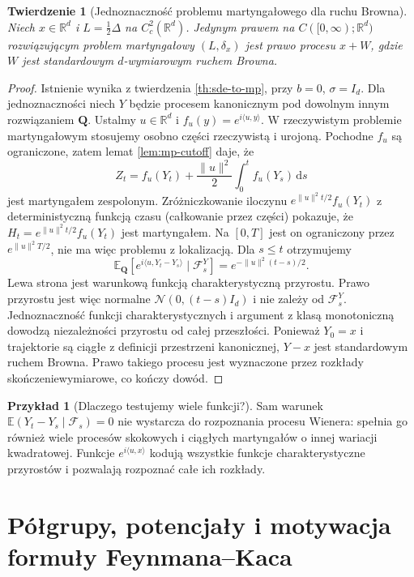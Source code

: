 \documentclass[11pt,a4paper,oneside]{report}
\numberwithin{equation}{chapter}
\theoremstyle{plain}
\newtheorem{twierdzenie}{Twierdzenie}[chapter]
\theoremstyle{definition}
\newtheorem{przyklad}{Przykład}[chapter]
\theoremstyle{remark}
\newcommand{\R}{\mathbb{R}}
\newcommand{\E}{\mathbb{E}}
\newcommand{\calF}{\mathcal{F}}
\newcommand{\dd}{\mathrm{d}}
\newcommand{\norm}[1]{\lVert #1\rVert}
\newcommand{\Normal}{\mathcal{N}}
\begin{document}
\begin{twierdzenie}[Jednoznaczność problemu martyngałowego dla ruchu Browna]\label{thm:volIII:07:02}
\label{th:mp-bm}
Niech $x\in\R^d$ i $L=\frac12\Delta$ na $C_c^2(\R^d)$.
Jedynym prawem na $C([0,\infty);\R^d)$ rozwiązującym
problem martyngałowy $(L,\delta_x)$ jest prawo procesu
$x+W$, gdzie $W$ jest standardowym $d$-wymiarowym
ruchem Browna.
\end{twierdzenie}
\begin{proof}
Istnienie wynika z twierdzenia \ref{th:sde-to-mp},
przy $b=0$, $\sigma=I_d$. Dla jednoznaczności niech
$Y$ będzie procesem kanonicznym pod dowolnym innym
rozwiązaniem $\mathbf Q$. Ustalmy $u\in\R^d$ i
$f_u(y)=e^{i\langle u,y\rangle}$. W rzeczywistym
problemie martyngałowym stosujemy osobno części rzeczywistą
i urojoną. Pochodne $f_u$ są ograniczone, zatem lemat
\ref{lem:mp-cutoff} daje, że
\[
Z_t=f_u(Y_t)+\frac{\norm u^2}{2}\int_0^t f_u(Y_s)\,\dd s
\]
jest martyngałem zespolonym. Zróżniczkowanie iloczynu
$e^{\norm u^2t/2}f_u(Y_t)$ z deterministyczną funkcją
czasu (całkowanie przez części) pokazuje, że
$H_t=e^{\norm u^2t/2}f_u(Y_t)$ jest martyngałem.
Na $[0,T]$ jest on ograniczony przez $e^{\norm u^2T/2}$,
nie ma więc problemu z lokalizacją.
Dla $s\le t$ otrzymujemy
\[
\E_{\mathbf Q}[e^{i\langle u,Y_t-Y_s\rangle}\mid\calF_s^Y]
=e^{-\norm u^2(t-s)/2}.
\]
Lewa strona jest warunkową funkcją charakterystyczną
przyrostu. Prawo przyrostu jest więc normalne
$\Normal(0,(t-s)I_d)$ i nie zależy od $\calF_s^Y$.
Jednoznaczność funkcji charakterystycznych i
argument z klasą monotoniczną dowodzą niezależności
przyrostu od całej przeszłości. Ponieważ $Y_0=x$ i
trajektorie są ciągłe z definicji przestrzeni kanonicznej,
$Y-x$ jest standardowym ruchem Browna.
Prawo takiego procesu jest wyznaczone przez rozkłady
skończeniewymiarowe, co kończy dowód.
\end{proof}

\begin{przyklad}[Dlaczego testujemy wiele funkcji?]
Sam warunek $\E(Y_t-Y_s\mid\calF_s)=0$ nie wystarcza
do rozpoznania procesu Wienera: spełnia go również
wiele procesów skokowych i ciągłych martyngałów o innej
wariacji kwadratowej. Funkcje
$e^{i\langle u,x\rangle}$ kodują wszystkie
funkcje charakterystyczne przyrostów i pozwalają
rozpoznać całe ich rozkłady.
\end{przyklad}

\section{Półgrupy, potencjały i motywacja formuły Feynmana--Kaca}\label{sec:volIII:07:03}
\end{document}
